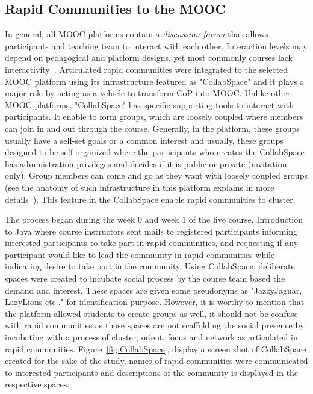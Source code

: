 \documentclass[manuscript,screen,review]{acmart}
\begin{document}
\subsection{Rapid Communities to the MOOC}
In general, all MOOC platforms contain a \textit{discussion forum} that  allows participants and teaching team to interact with each other. Interaction levels may depend on pedagogical and platform designs, yet most commonly courses lack interactivity~\cite{gamage2020moocs}. Articulated rapid communities were integrated to the selected MOOC platform using its infrastructure featured as "CollabSpace" and it plays a major role by acting as a vehicle to transform CoP into MOOC. Unlike other MOOC platforms, "CollabSpace" has specific supporting tools to interact with participants. It enable to form groups, which are loosely coupled where members can join in and out through the course. Generally, in the platform, these groups usually have a self-set goals or a common interest and usually, these groups designed to be self-organized where the participants who creates the CollabSpace has administration privileges and decides if it is public or private (invitation only). Group members can come and go as they want with loosely coupled groups (see the anatomy of such infrastructure in this platform explains in more details~\cite{staubitz2014supporting,staubitz2017collaboration}). This feature in the CollabSpace enable rapid communities to cluster. 

The process began during the week 0 and week 1 of the live course, Introduction to Java where course instructors sent mails to registered participants informing interested participants to take part in rapid communities, and requesting if any participant would like to lead the community in rapid communities while indicating desire to take part in the community. Using CollabSpace, deliberate spaces were created to incubate social process by the course team based the demand and interest. These spaces are  given some pseudonyms as "JazzyJaguar, LazyLions etc.." for identification purpose. However, it is worthy to mention that the platform allowed students to create groups as well, it should not be confuse with rapid communities as those spaces are not scaffolding the social presence by incubating with a process of cluster, orient, focus and network as articulated in rapid communities. Figure~\ref{fig:CollabSpace}, display a screen shot of CollabSpace created for the sake of the study, names of rapid communities were communicated to interested participants and descriptions of the community is displayed in the respective spaces.  
\end{document}
